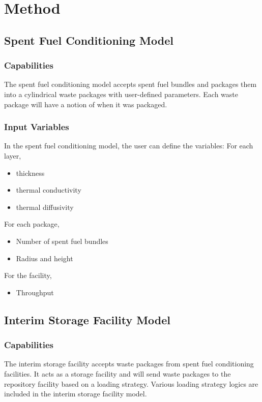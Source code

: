 \chapter{Method}

\section{Spent Fuel Conditioning Model}
\subsection{Capabilities}
The spent fuel conditioning model accepts spent fuel bundles and 
packages them into a cylindrical waste packages with user-defined
parameters. 
Each waste package will have a notion of when it was packaged. 

\subsection{Input Variables}
In the spent fuel conditioning model, the user can define the 
variables: 
For each layer, 
\begin{itemize}
	\item thickness
	\item thermal conductivity 
	\item thermal diffusivity
\end{itemize}

For each package,
\begin{itemize}
	\item Number of spent fuel bundles
	\item Radius and height
\end{itemize}

For the facility,  
\begin{itemize}
	\item Throughput 
\end{itemize}

\section{Interim Storage Facility Model}
\subsection{Capabilities}
The interim storage facility accepts waste packages from
spent fuel conditioning facilities. 
It acts as a storage facility and will send waste packages to 
the repository facility based on a loading strategy. 
Various loading strategy logics are included in the interim 
storage facility model. 

